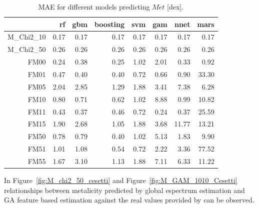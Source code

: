 {\begin{table}[ht]
\centering
\begin{tabular}{rrrrrrrr}
  \hline
 & rf & gbm & boosting & svm & gam & nnet & mars \\ 
  \hline
M\_Chi2\_10 & 0.17 & 0.17 & 0.17 & 0.17 & 0.17 & 0.17 & 0.17 \\ 
  M\_Chi2\_50 & 0.26 & 0.26 & 0.26 & 0.26 & 0.26 & 0.26 & 0.26 \\ 
  FM00 & 0.24 & 0.38 & 0.25 & 1.02 & 2.01 & 0.33 & 0.92 \\ 
  FM01 & 0.47 & 0.40 & 0.40 & 0.72 & 0.66 & 0.90 & 33.30 \\ 
  FM05 & 2.04 & 2.85 & 1.29 & 1.88 & 3.41 & 7.38 & 6.28 \\ 
  FM10 & 0.80 & 0.71 & 0.62 & 1.02 & 8.88 & 0.99 & 10.82 \\ 
  FM11 & 0.43 & 0.37 & 0.46 & 0.72 & 0.24 & 0.37 & 25.59 \\ 
  FM15 & 1.90 & 2.68 & 1.05 & 1.88 & 3.68 & 11.77 & 13.21 \\ 
  FM50 & 0.78 & 0.79 & 0.40 & 1.02 & 5.13 & 1.83 & 9.90 \\ 
  FM51 & 1.01 & 1.08 & 0.54 & 0.72 & 2.22 & 3.36 & 77.52 \\ 
  FM55 & 1.67 & 3.10 & 1.13 & 1.88 & 7.11 & 6.33 & 11.22 \\
   \hline
   \end{tabular}
\caption { MAE for different models predicting $Met$ [dex].} 
\label{tab:models_M_mae} 
\end{table}
   

In Figure~\ref{fig:M_chi2_50_cesetti} and Figure~\ref{fig:M_GAM_1010_Cesetti} 
relationships between metalicity predicted by global espectrum estimation 
and GA feature based estimation against the real values
provided by \cite{2013A&A...549A.129C} can be observed.

}
